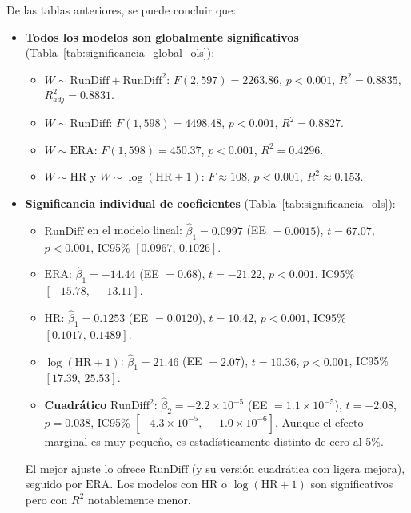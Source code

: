 \documentclass[10pt]{article}
\begin{document}




De las tablas anteriores, se puede concluir que:
\begin{itemize}
    \item \textbf{Todos los modelos son globalmente significativos} (Tabla~\ref{tab:significancia_global_ols}):
    \begin{itemize}
        \item \(W \sim \text{RunDiff} + \text{RunDiff}^2\): \(F(2,597)=2263.86\), \(p<0.001\), \(R^2=0.8835\), \(R^2_{adj}=0.8831\).
        \item \(W \sim \text{RunDiff}\): \(F(1,598)=4498.48\), \(p<0.001\), \(R^2=0.8827\).
        \item \(W \sim \text{ERA}\): \(F(1,598)=450.37\), \(p<0.001\), \(R^2=0.4296\).
        \item \(W \sim \text{HR}\) y \(W \sim \log(\text{HR}+1)\): \(F\approx 108\), \(p<0.001\), \(R^2\approx 0.153\).
    \end{itemize}

    \item \textbf{Significancia individual de coeficientes} (Tabla~\ref{tab:significancia_ols}):
    \begin{itemize}
        \item \(\text{RunDiff}\) en el modelo lineal: \(\hat\beta_1=0.0997\) (EE \(=0.0015\)), \(t=67.07\), \(p<0.001\), IC95\% \([0.0967,\,0.1026]\). 
        \item \(\text{ERA}\): \(\hat\beta_1=-14.44\) (EE \(=0.68\)), \(t=-21.22\), \(p<0.001\), IC95\% \([-15.78,\,-13.11]\).
        \item \(\text{HR}\): \(\hat\beta_1=0.1253\) (EE \(=0.0120\)), \(t=10.42\), \(p<0.001\), IC95\% \([0.1017,\,0.1489]\).
        \item \(\log(\text{HR}+1)\): \(\hat\beta_1=21.46\) (EE \(=2.07\)), \(t=10.36\), \(p<0.001\), IC95\% \([17.39,\,25.53]\).
        \item \textbf{Cuadrático} \(\text{RunDiff}^2\): \(\hat\beta_2=-2.2\times 10^{-5}\) (EE \(=1.1\times10^{-5}\)), \(t=-2.08\), \(p=0.038\), IC95\% \([-4.3\times10^{-5},\,-1.0\times10^{-6}]\). Aunque el efecto marginal es muy pequeño, es estadísticamente distinto de cero al 5\%.
    \end{itemize}

    El mejor ajuste lo ofrece \(\text{RunDiff}\) (y su versión cuadrática con ligera mejora), seguido por \(\text{ERA}\). Los modelos con \(\text{HR}\) o \(\log(\text{HR}+1)\) son significativos pero con \(R^2\) notablemente menor.
\end{itemize}
\end{document}
